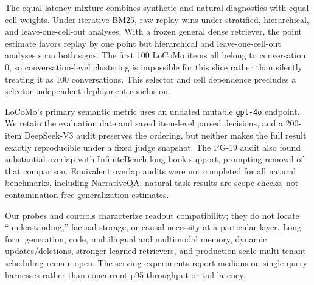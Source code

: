 The equal-latency mixture combines synthetic and natural diagnostics with equal
cell weights. Under iterative BM25, raw replay wins under stratified,
hierarchical, and leave-one-cell-out analyses. With a frozen general dense
retriever, the point estimate favors replay by one point but hierarchical and
leave-one-cell-out analyses span both signs. The first 100 LoCoMo items all
belong to conversation 0, so conversation-level clustering is impossible for
this slice rather than silently treating it as 100 conversations. This
selector and cell dependence precludes a selector-independent deployment
conclusion.

LoCoMo's primary semantic metric uses an undated mutable \texttt{gpt-4o}
endpoint. We retain the evaluation date and saved item-level parsed decisions,
and a 200-item DeepSeek-V3 audit preserves the ordering, but neither makes the
full result exactly reproducible under a fixed judge snapshot. The PG-19 audit
also found substantial overlap with InfiniteBench long-book support, prompting
removal of that comparison. Equivalent overlap audits were not completed for
all natural benchmarks, including NarrativeQA; natural-task results are scope
checks, not contamination-free generalization estimates.

Our probes and controls characterize readout compatibility; they do not locate
``understanding,'' factual storage, or causal necessity at a particular layer.
Long-form generation, code, multilingual and multimodal memory, dynamic
updates/deletions, stronger learned retrievers, and production-scale
multi-tenant scheduling remain open. The serving experiments report medians on
single-query harnesses rather than concurrent p95 throughput or tail latency.
